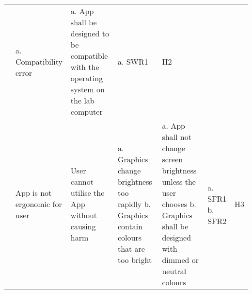 \documentclass{article}
\begin{document}
\begin{landscape}
\begin{table}[h]
\begin{tabular}{|P{20mm}|P{30mm}|P{30mm}|P{30mm}|P{35mm}|P{20mm}|P{10mm}|}
    & a. Compatibility error
    & a. App shall be designed to be compatible with the operating system on the lab computer
    & a. SWR1
    & H2  \\ 
    & App is not ergonomic for user
    & User cannot utilise the App without causing harm
    & a. Graphics change brightness too rapidly \newline
      b. Graphics contain colours that are too bright \newline
    & a. App shall not change screen brightness unless the user chooses \newline
      b. Graphics shall be designed with dimmed or neutral colours
    & a. SFR1 \newline
      b. SFR2 \newline
    & H3 \\ \hline
  \end{tabular}
\end{table}
\end{landscape}
\end{document}
